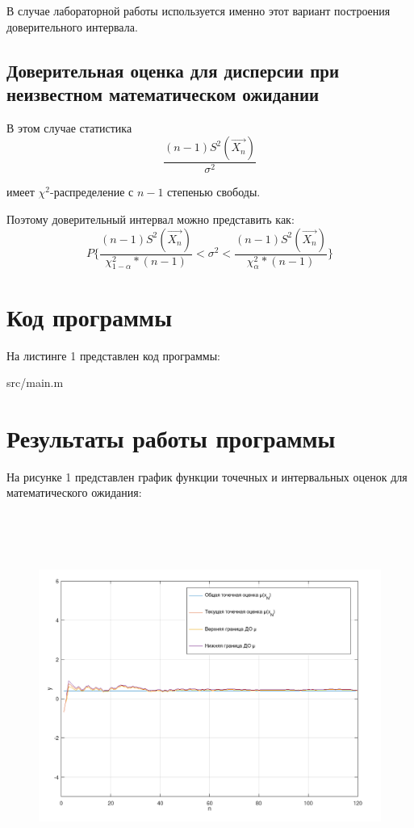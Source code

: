 В случае лабораторной работы используется именно этот вариант построения доверительного интервала.

\section*{Доверительная оценка для дисперсии при неизвестном математическом ожидании}
В этом случае статистика
\begin{equation}
\frac{(n - 1)S^2(\vec{X_n})}{\sigma^2}
\end{equation}

имеет $\chi^2$-распределение с $n - 1$ степенью свободы.

Поэтому доверительный интервал можно представить как:
\begin{equation}
P\{\frac{(n- 1)S^2(\vec{X_n})}{\chi^2_{1 - \alpha} * (n - 1)} < \sigma^2 < \frac{(n- 1)S^2(\vec{X_n})}{\chi^2_{\alpha} * (n - 1)} \}
\end{equation}
 
\chapter*{Код программы}
На листинге 1 представлен код программы:
\FloatBarrier
\begin{lstinputlisting}{src/main.m}
\end{lstinputlisting}
\FloatBarrier

\chapter*{Результаты работы программы}
На рисунке 1 представлен график функции точечных и интервальных оценок для математического ожидания:
\FloatBarrier
\begin{figure}[h]
	\begin{center}
		\includegraphics[width=\linewidth, height=12cm]{inc/mu.png}
	\end{center}
\end{figure}
\FloatBarrier

